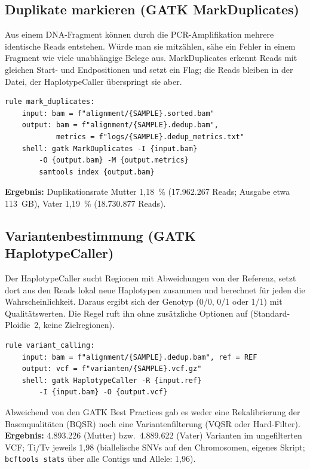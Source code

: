 \documentclass[10pt,a4paper,twocolumn]{article}
\begin{document}
\subsection{Duplikate markieren (GATK MarkDuplicates)}
Aus einem DNA-Fragment können durch die PCR-Amplifikation mehrere identische Reads entstehen. Würde man sie mitzählen, sähe ein Fehler in einem Fragment wie viele unabhängige Belege aus. MarkDuplicates erkennt Reads mit gleichen Start- und Endpositionen und setzt ein Flag; die Reads bleiben in der Datei, der HaplotypeCaller überspringt sie aber.
\begin{lstlisting}
rule mark_duplicates:
    input: bam = f"alignment/{SAMPLE}.sorted.bam"
    output: bam = f"alignment/{SAMPLE}.dedup.bam",
            metrics = f"logs/{SAMPLE}.dedup_metrics.txt"
    shell: gatk MarkDuplicates -I {input.bam}
        -O {output.bam} -M {output.metrics}
        samtools index {output.bam}
\end{lstlisting}
\textbf{Ergebnis:} Duplikationsrate Mutter 1,18~\% (17.962.267 Reads; Ausgabe etwa 113~GB), Vater 1,19~\% (18.730.877 Reads).
 
\subsection{Variantenbestimmung (GATK HaplotypeCaller)}
Der HaplotypeCaller \citep{mckenna2010} sucht Regionen mit Abweichungen von der Referenz, setzt dort aus den Reads lokal neue Haplotypen zusammen und berechnet für jeden die Wahrscheinlichkeit. Daraus ergibt sich der Genotyp (0/0, 0/1 oder 1/1) mit Qualitätswerten. Die Regel ruft ihn ohne zusätzliche Optionen auf (Standard-Ploidie~2, keine Zielregionen).
\begin{lstlisting}
rule variant_calling:
    input: bam = f"alignment/{SAMPLE}.dedup.bam", ref = REF
    output: vcf = f"varianten/{SAMPLE}.vcf.gz"
    shell: gatk HaplotypeCaller -R {input.ref}
        -I {input.bam} -O {output.vcf}
\end{lstlisting}
Abweichend von den GATK Best Practices \citep{vanderauwera2013} gab es weder eine Rekalibrierung der Basenqualitäten (BQSR) noch eine Variantenfilterung (VQSR oder Hard-Filter). \textbf{Ergebnis:} 4.893.226 (Mutter) bzw.\ 4.889.622 (Vater) Varianten im ungefilterten VCF; Ti/Tv jeweils 1,98 (biallelische SNVs auf den Chromosomen, eigenes Skript; \texttt{bcftools stats} über alle Contigs und Allele: 1,96).
 
\end{document}
